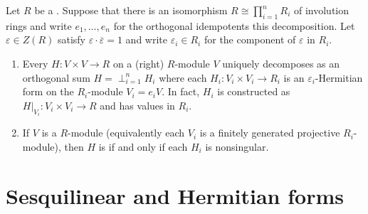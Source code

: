 \nocite{*}

\begin{lemma} \label{lemma:hermitian_modules_over_product_of_involution_rings_split_along_involution_ring_factors}
    Let $R$ be a . Suppose that there is an isomorphism $R \cong \prod_{i=1}^n R_i$ of involution rings and write $e_1,\ldots,e_n$ for the   orthogonal idempotents  this decomposition. Let $\varepsilon \in Z(R)$ satisfy $\varepsilon \cdot \overline{\varepsilon} = 1$ and write $\varepsilon_i \in R_i$ for the component of $\varepsilon$ in $R_i$. 
    \begin{enumerate}
        \item Every  $H: V \times V \to R$ on a (right) $R$-module $V$ uniquely decomposes as an orthogonal sum $H = \perp_{i=1}^n H_i$ where each $H_i: V_i \times V_i \to R_i$ is an $\varepsilon_i$-Hermitian form on the $R_i$-module $V_i = e_i V$. In fact, $H_i$ is constructed as $H|_{V_i}: V_i \times V_i \to R$ and has values in $R_i$.

        \item If $V$ is a   $R$-module (equivalently each $V_i$ is a finitely generated projective $R_i$-module), then $H$ is  if and only if each $H_i$ is nonsingular.
    \end{enumerate}
\end{lemma}



\section{Sesquilinear and Hermitian forms}

